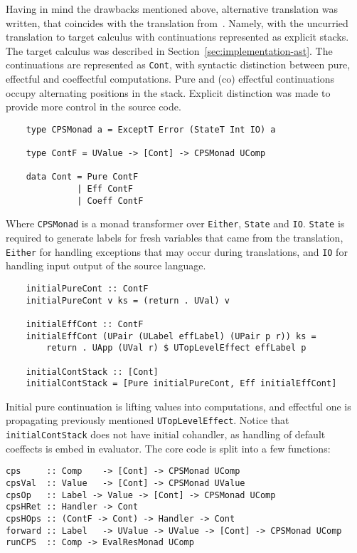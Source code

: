 \documentclass[declaration,shortabstract]{iithesis}
\theoremstyle{definition} \newtheorem{definition}{Definition}[chapter]
\theoremstyle{remark} \newtheorem{remark}[definition]{Observation}
\theoremstyle{plain} \newtheorem{theorem}[definition]{Theorem}
\theoremstyle{plain} \newtheorem{lemma}[definition]{Lemma}
\begin{document}
    Having in mind the drawbacks mentioned above, alternative translation was
    written, that coincides with the translation from~\cite{handlers-cps-journal}.
    Namely, with the uncurried translation to target calculus with continuations
    represented as explicit stacks. The target calculus was described in
    Section~\ref{sec:implementation-ast}. The continuations are represented as
    \verb!Cont!, with syntactic distinction between pure, effectful and
    coeffectful computations. Pure and (co) effectful continuations occupy
    alternating positions in the stack. Explicit distinction was made to provide
    more control in the source code.

\begin{verbatim}
    type CPSMonad a = ExceptT Error (StateT Int IO) a

    type ContF = UValue -> [Cont] -> CPSMonad UComp

    data Cont = Pure ContF
              | Eff ContF
              | Coeff ContF
\end{verbatim}

    \noindent
    Where \verb!CPSMonad! is a monad transformer over \verb!Either!, \verb!State!
    and \verb!IO!. \verb!State! is required to generate labels for fresh variables
    that came from the translation, \verb!Either! for handling exceptions that
    may occur during translations, and \verb!IO! for handling input output of the
    source language.

\begin{verbatim}
    initialPureCont :: ContF
    initialPureCont v ks = (return . UVal) v

    initialEffCont :: ContF
    initialEffCont (UPair (ULabel effLabel) (UPair p r)) ks =
        return . UApp (UVal r) $ UTopLevelEffect effLabel p

    initialContStack :: [Cont]
    initialContStack = [Pure initialPureCont, Eff initialEffCont]
\end{verbatim}

    \noindent
    Initial pure continuation is lifting values into computations,
    and effectful one is propagating previously mentioned \verb!UTopLevelEffect!.
    Notice that \verb!initialContStack! does not have initial cohandler,
    as handling of default coeffects is embed in evaluator. The core code is
    split into a few functions:

\begin{verbatim}
cps     :: Comp    -> [Cont] -> CPSMonad UComp
cpsVal  :: Value   -> [Cont] -> CPSMonad UValue
cpsOp   :: Label -> Value -> [Cont] -> CPSMonad UComp
cpsHRet :: Handler -> Cont
cpsHOps :: (ContF -> Cont) -> Handler -> Cont
forward :: Label   -> UValue -> UValue -> [Cont] -> CPSMonad UComp
runCPS  :: Comp -> EvalResMonad UComp
\end{verbatim}
\end{document}
